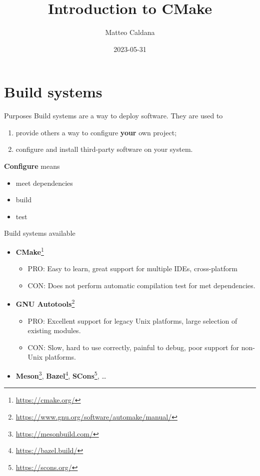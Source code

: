 \documentclass[aspectratio=169,11pt]{beamer}
\title{Introduction to CMake}
\author{Matteo Caldana}
\institute{Politecnico di Milano}
\date{2023-05-31}
\begin{document}
\begin{frame}[plain]{}
    \maketitle
\end{frame}

\section{Build systems}
\begin{frame}{Purposes}
    Build systems are a way to deploy software.
    \vfill
    They are used to
    \begin{enumerate}
        \item provide others a way to configure \textbf{your} own project;
        \item configure and install third-party software on your system.
    \end{enumerate}
    \vfill
    \textbf{Configure} means
    \begin{itemize}
        \item meet dependencies
        \item build
        \item test
    \end{itemize}
\end{frame}

\begin{frame}{Build systems available}
    \begin{itemize}
    \item \textbf{CMake}\footnote{\url{https://cmake.org/}}
    \begin{itemize}
    \item PRO: Easy to learn, great support for multiple IDEs, cross-platform
    \item CON: Does not perform automatic compilation test for met dependencies.
    \end{itemize}
    \item \textbf{GNU Autotools}\footnote{\url{https://www.gnu.org/software/automake/manual/}}
    \begin{itemize}
    \item PRO: Excellent support for legacy Unix platforms, large selection of existing modules.
    \item CON: Slow, hard to use correctly, painful to debug, poor support for non-Unix platforms.
    \end{itemize}
    \item \textbf{Meson}\footnote{\url{https://mesonbuild.com/}}, \textbf{Bazel}\footnote{\url{https://bazel.build/}}, \textbf{SCons}\footnote{\url{https://scons.org/}}, \dots
    \end{itemize}
\end{frame}
\end{document}
